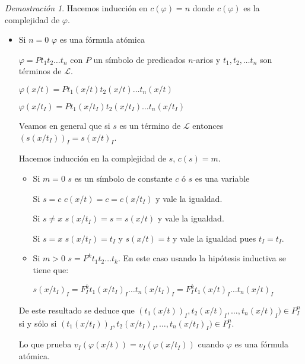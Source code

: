 \documentclass[a4paper,11pt]{article}
\theoremstyle{definition}
\theoremstyle{remark}
\newtheorem*{demo}{Demostración}
\def\LL{\ensuremath{\mathcal{L}}}
\begin{document}
\begin{demo}
    Hacemos inducción en $c(\varphi) = n$ donde $c(\varphi)$ es la
    complejidad de $\varphi$.
    
    \begin{itemize}
    
        \item Si $n = 0$ $\varphi$ es una fórmula atómica
            
        $\varphi = P t_1 t_2 \dots t_n$ con $P$ un símbolo de predicados 
        $n$-arios y $t_1, t_2, \dots t_n$ son términos de $\LL$.
        
        $\varphi(x/t) = P t_1(x/t) t_2(x/t) \dots t_n(x/t)$
        
        $\varphi(x/t_I) = P t_1(x/t_I) t_2(x/t_I) \dots t_n(x/t_I)$
        
        Veamos en general que si $s$ es un término de $\LL$ entonces
        $(s(x/t_I))_I = s(x/t)_I$.
        
        Hacemos inducción en la complejidad de $s$, $c(s) = m$.
        
        \begin{itemize}
            \item Si $m = 0$ $s$ es un símbolo de constante $c$ ó
            $s$ es una variable
            
            Si $s = c$ $c(x/t) = c = c(x/t_I)$ y vale la igualdad.
            
            Si $s \neq x$ $s(x/t_I) = s = s(x/t)$ y vale la igualdad.
            
            Si $s = x$ $s(x/t_I) = t_I$ y $s(x/t) = t$ y vale la 
            igualdad pues $t_I = t_I$.
            
            \item Si $m > 0$ $s = F^k t_1 t_2 \dots t_k$. En este caso
            usando la hipótesis inductiva se tiene que:
            
            $s(x/t_I)_I = F^k_I t_1(x/t_I)_I \dots t_n(x/t_I)_I
            = F^k_I t_1(x/t)_I \dots t_n(x/t)_I$
        \end{itemize}
    
        De este resultado se deduce que 
        $(t_1(x/t))_I, t_2(x/t)_I, \dots, t_n(x/t)_I) \in P^n_I$ si y sólo si
        $(t_1(x/t_I))_I, t_2(x/t_I)_I, \dots, t_n(x/t_I)_I) \in P^n_I$.
        
        Lo que prueba $v_I(\varphi(x/t)) = v_I(\varphi(x/t_I))$ cuando
        $\varphi$ es una fórmula atómica.


\end{itemize}
\end{demo}
\end{document}
